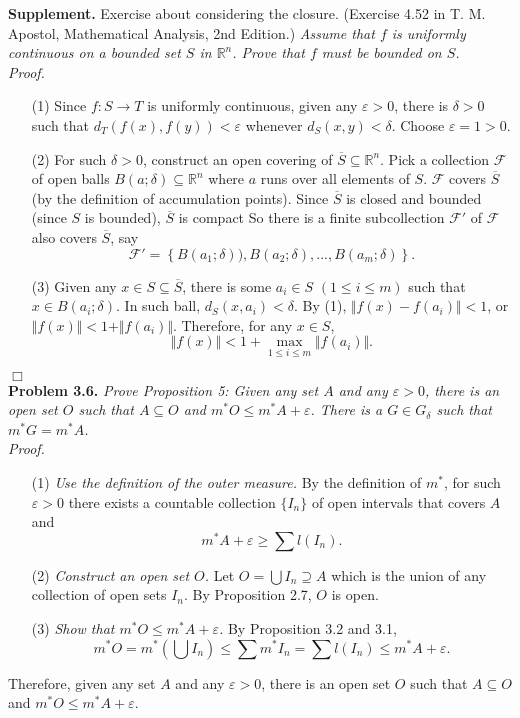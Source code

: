 \documentclass{article}
\begin{document}
\textbf{Supplement.}
Exercise about considering the closure.
(Exercise 4.52 in T. M. Apostol, Mathematical Analysis, 2nd Edition.)
\emph{Assume that $f$ is uniformly continuous on a bounded set $S$ in $\mathbb{R}^n$.
Prove that $f$ must be bounded on $S$.} \\

\emph{Proof.}
\begin{enumerate}
\item[(1)]
Since $f: S \rightarrow T$ is uniformly continuous,
given any $\varepsilon > 0$, there is $\delta > 0$ such that
$d_T(f(x), f(y)) < \varepsilon$ whenever $d_S(x, y) < \delta$.
Choose $\varepsilon = 1 > 0$.
\item[(2)]
For such $\delta > 0$, construct an open covering of $\overline{S} \subseteq \mathbb{R}^n$.
Pick a collection $\mathscr{F}$ of open balls
$B(a;\delta) \subseteq \mathbb{R}^n$
where $a$ runs over all elements of $S$.
$\mathscr{F}$ covers $\overline{S}$ (by the definition of accumulation points).
Since $\overline{S} $ is closed and bounded (since $S$ is bounded),
$\overline{S}$ is compact
So there is a finite subcollection $\mathscr{F}'$ of $\mathscr{F}$
also covers $\overline{S}$, say
$$\mathscr{F}'
= \left\{B(a_1;\delta)), B(a_2;\delta), ..., B(a_m;\delta) \right\}.$$
\item[(3)]
Given any $x \in S \subseteq \overline{S}$,
there is some $a_i \in S$ $(1 \leq i \leq m)$ such that $x \in B(a_i;\delta)$.
In such ball, $d_S(x, a_i) < \delta$.
By (1), $\Vert f(x) - f(a_i) \Vert < 1$,
or $\Vert f(x) \Vert < 1 + \Vert f(a_i) \Vert$.
Therefore, for any $x \in S$,
$$\Vert f(x) \Vert < 1 + \max_{1 \leq i \leq m}{\Vert f(a_i) \Vert}.$$
\end{enumerate}
$\Box$ \\



\textbf{Problem 3.6.}
\emph{Prove Proposition 5:
Given any set $A$ and any $\varepsilon > 0$,
there is an open set $O$ such that $A \subseteq O$
and $m^{*}O \leq m^{*}A + \varepsilon$.
There is a $G \in G_{\delta}$ such that $m^{*}G = m^{*}A$.} \\

\emph{Proof.}
\begin{enumerate}
\item[(1)]
\emph{Use the definition of the outer measure.}
By the definition of $m^{*}$,
for such $\varepsilon > 0$ there exists a countable collection
$\{ I_n \}$ of open intervals that covers $A$ and
$$m^{*} A + \varepsilon \geq \sum l(I_n).$$
\item[(2)]
\emph{Construct an open set $O$.}
Let $O = \bigcup I_n \supseteq A$
which is the union of any collection of open sets $I_n$.
By Proposition 2.7, $O$ is open.
\item[(3)]
\emph{Show that $m^{*}O \leq m^{*}A + \varepsilon$.}
By Proposition 3.2 and 3.1,
$$m^{*}O
= m^{*} \left( \bigcup I_n \right)
\leq \sum m^{*} I_n
= \sum l(I_n)
\leq m^{*} A + \varepsilon.$$
\end{enumerate}
Therefore, given any set $A$ and any $\varepsilon > 0$,
there is an open set $O$ such that $A \subseteq O$
and $m^{*}O \leq m^{*}A + \varepsilon$.
\end{document}
